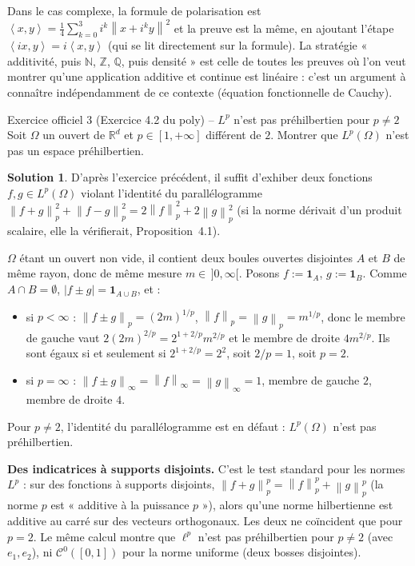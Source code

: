 \documentclass[11pt,a4paper]{article}
\newcommand{\R}{\mathbb{R}}
\newcommand{\N}{\mathbb{N}}
\newcommand{\Z}{\mathbb{Z}}
\newcommand{\Q}{\mathbb{Q}}
\newcommand{\norm}[1]{\left\|#1\right\|}
\newcommand{\ps}[2]{\left\langle #1,#2\right\rangle}
\newcommand{\Cz}{\mathcal{C}^0}
\theoremstyle{definition}
\newtheorem*{solution}{Solution}
\begin{document}
\begin{commentaire}
Dans le cas complexe, la formule de polarisation est $\ps xy=\frac14\sum_{k=0}^3i^k\norm{x+i^ky}^2$ et la preuve est la même, en ajoutant l'étape $\ps{ix}y=i\ps xy$ (qui se lit directement sur la formule). La stratégie « additivité, puis $\N$, $\Z$, $\Q$, puis densité » est celle de toutes les preuves où l'on veut montrer qu'une application additive et continue est linéaire : c'est un argument à connaître indépendamment de ce contexte (équation fonctionnelle de Cauchy).
\end{commentaire}

\begin{exo}{Exercice officiel 3 (Exercice 4.2 du poly) -- $L^p$ n'est pas préhilbertien pour $p\ne2$}
Soit $\Omega$ un ouvert de $\R^d$ et $p\in[1,+\infty]$ différent de $2$. Montrer que $L^p(\Omega)$ n'est pas un espace préhilbertien.
\end{exo}

\begin{solution}
D'après l'exercice précédent, il suffit d'exhiber deux fonctions $f,g\in L^p(\Omega)$ violant l'identité du parallélogramme $\norm{f+g}_p^2+\norm{f-g}_p^2=2\norm f_p^2+2\norm g_p^2$ (si la norme dérivait d'un produit scalaire, elle la vérifierait, Proposition~4.1).

$\Omega$ étant un ouvert non vide, il contient deux boules ouvertes disjointes $A$ et $B$ de même rayon, donc de même mesure $m\in\,]0,\infty[$. Posons $f:=\mathbf 1_A$, $g:=\mathbf 1_B$. Comme $A\cap B=\emptyset$, $|f\pm g|=\mathbf 1_{A\cup B}$, et :
\begin{itemize}
  \item si $p<\infty$ : $\norm{f\pm g}_p=(2m)^{1/p}$, $\norm f_p=\norm g_p=m^{1/p}$, donc le membre de gauche vaut $2(2m)^{2/p}=2^{1+2/p}m^{2/p}$ et le membre de droite $4m^{2/p}$. Ils sont égaux si et seulement si $2^{1+2/p}=2^2$, soit $2/p=1$, soit $p=2$.
  \item si $p=\infty$ : $\norm{f\pm g}_\infty=\norm f_\infty=\norm g_\infty=1$, membre de gauche $2$, membre de droite $4$.
\end{itemize}
Pour $p\ne2$, l'identité du parallélogramme est en défaut : $L^p(\Omega)$ n'est pas préhilbertien.
\end{solution}

\begin{pointcle}
\textbf{Des indicatrices à supports disjoints.} C'est le test standard pour les normes $L^p$ : sur des fonctions à supports disjoints, $\norm{f+g}_p^p=\norm f_p^p+\norm g_p^p$ (la norme $p$ est « additive à la puissance $p$ »), alors qu'une norme hilbertienne est additive au carré sur des vecteurs orthogonaux. Les deux ne coïncident que pour $p=2$. Le même calcul montre que $\ell^p$ n'est pas préhilbertien pour $p\ne2$ (avec $e_1,e_2$), ni $\Cz([0,1])$ pour la norme uniforme (deux bosses disjointes).
\end{pointcle}
\end{document}
